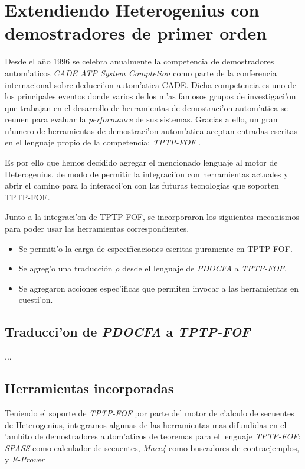 \section{Extendiendo Heterogenius con demostradores de primer orden}

Desde el a\~no 1996 se celebra anualmente la competencia de demostradores autom'aticos \emph{CADE ATP System Comptetion} \cite{casc} como parte de la conferencia internacional sobre deducci'on autom'atica CADE.
Dicha competencia es uno de los principales eventos donde varios de los m'as famosos grupos de investigaci'on que trabajan en el desarrollo de herramientas de demostraci'on autom'atica se reunen para evaluar la \emph{performance} de sus sistemas.
Gracias a ello, un gran n'umero de herramientas de demostraci'on autom'atica aceptan entradas escritas en el lenguaje propio de la competencia: \textit{TPTP-FOF} \cite{fof}.

Es por ello que hemos decidido agregar el mencionado lenguaje al motor de Heterogenius, de modo de permitir la integraci'on con herramientas actuales y abrir el camino para la interacci'on con las futuras tecnologías que soporten TPTP-FOF.

Junto a la integraci'on de TPTP-FOF, se incorporaron los siguientes mecanismos para poder usar las herramientas correspondientes.

\begin{itemize}
\item Se permiti'o la carga de especificaciones escritas puramente en TPTP-FOF.

\item Se agreg'o una traducción $\rho$ desde el lenguaje de \textit{PDOCFA} a \textit{TPTP-FOF}. 

\item Se agregaron acciones espec'ificas que permiten invocar a las herramientas en cuesti'on.
\end{itemize}

\subsection{Traducci'on de \emph{PDOCFA} a \emph{TPTP-FOF}}

...

\subsection{Herramientas incorporadas}

Teniendo el soporte de \textit{TPTP-FOF} por parte del motor de c'alculo de secuentes de Heterogenius, integramos algunas de las herramientas mas difundidas en el 'ambito de demostradores autom'aticos de teoremas para el lenguaje \textit{TPTP-FOF}: \textit{SPASS} como calculador de secuentes, \textit{Mace4} como buscadores de contraejemplos, y \textit{E-Prover}  

